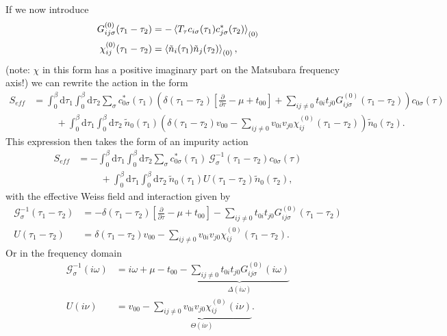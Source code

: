 \documentclass[12pt,a4paper]{scrartcl}
\numberwithin{equation}{section}
\begin{document}
If we now introduce 
\begin{align}
 G_{ij\sigma}^{(0)}(\tau_1-\tau_2) &= -\braket{T_{\tau} c_{i\sigma}(\tau_1) c^*_{j\sigma}(\tau_2) }_{(0)} \\
 \chi_{ij}^{(0)}(\tau_1-\tau_2) &= \braket{ \tilde{n}_{i}(\tau_1)   \tilde{n}_{j}(\tau_2) }_{(0)} ,
\end{align}
(note: $\chi$ in this form has a positive imaginary part on the Matsubara frequency axis!)
we can rewrite the action in the form
\begin{align}
S_{eff} 
&= \int_0^{\beta} \mathrm{d}\tau_1 \int_0^{\beta} \mathrm{d}\tau_2 \sum_{\sigma} c^*_{0\sigma}(\tau_1)\left(
                \delta(\tau_1-\tau_2)\left[\frac{\partial}{\partial \tau} - \mu+t_{00} \right]
                + \sum_{ij\neq 0} t_{0i} t_{j0} G_{ij\sigma}^{(0)}(\tau_1-\tau_2)   \right) c_{0\sigma}(\tau)  \nonumber \\
&\hspace{1cm}    + \int_0^{\beta} \mathrm{d}\tau_1 \int_0^{\beta} \mathrm{d}\tau_2 \ \tilde{n}_{0}(\tau_1) 
       \left( \delta(\tau_1-\tau_2) v_{00} - \sum_{ij\neq 0} v_{0i} v_{j0} \chi^{(0)}_{ij}(\tau_1-\tau_2) \right)  \tilde{n}_{0}(\tau_2)  .
\end{align}
This expression then takes the form of an impurity action 
\begin{align}
S_{eff} 
&= -\int_0^{\beta} \mathrm{d}\tau_1 \int_0^{\beta} \mathrm{d}\tau_2 \sum_{\sigma} 
          c^*_{0\sigma}(\tau_1)\ \mathscr{G}^{-1}_{\sigma}(\tau_1-\tau_2) c_{0\sigma}(\tau)  \nonumber \\
&\hspace{1cm}    + \int_0^{\beta} \mathrm{d}\tau_1 \int_0^{\beta} \mathrm{d}\tau_2 \ \tilde{n}_{0}(\tau_1) 
       U(\tau_1-\tau_2)  \tilde{n}_{0}(\tau_2)  ,
\end{align}
with the effective Weiss field and interaction given by
\begin{align}
 \mathscr{G}^{-1}_{\sigma}(\tau_1-\tau_2) 
 &= -\delta(\tau_1-\tau_2)\left[\frac{\partial}{\partial \tau} - \mu +t_{00} \right] - \sum_{ij\neq 0} t_{0i} t_{j0} G_{ij\sigma}^{(0)}(\tau_1-\tau_2) \\
 U(\tau_1-\tau_2) 
 &= \delta(\tau_1-\tau_2) v_{00} - \sum_{ij\neq 0} v_{0i} v_{j0} \chi^{(0)}_{ij}(\tau_1-\tau_2).
\end{align}
Or in the frequency domain
\begin{align}
 \mathscr{G}^{-1}_{\sigma}(i\omega) 
 &= i\omega + \mu - t_{00} - \underbrace{\sum_{ij\neq 0} t_{0i} t_{j0} G_{ij\sigma}^{(0)}(i\omega)}_{\Delta(i\omega)} \\
 U(i\nu) 
 &= v_{00} - \underbrace{\sum_{ij\neq 0} v_{0i} v_{j0} \chi^{(0)}_{ij}(i\nu)}_{\Theta(i\nu)}.
\end{align}
\end{document}
